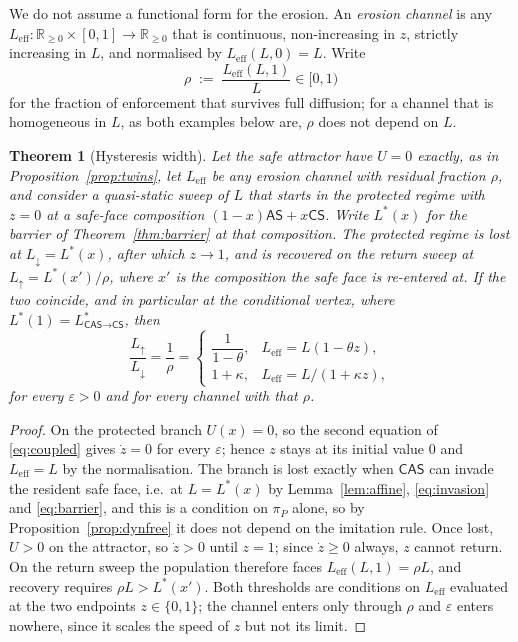 \documentclass[11pt,a4paper]{article}
\newtheorem{theorem}{Theorem}
\theoremstyle{definition}
\newcommand{\AS}{\textsf{AS}}
\newcommand{\CS}{\textsf{CS}}
\newcommand{\CAS}{\textsf{CAS}}
\newcommand{\piP}{\pi_{P}}
\newcommand{\R}{\mathbb{R}}
\begin{document}
We do not assume a functional form for the erosion. An \emph{erosion channel}
is any $L_{\mathrm{eff}}:\R_{\ge0}\times[0,1]\to\R_{\ge0}$ that is continuous,
non-increasing in $z$, strictly increasing in $L$, and normalised by
$L_{\mathrm{eff}}(L,0)=L$. Write
\begin{equation}
\rho \;:=\; \frac{L_{\mathrm{eff}}(L,1)}{L}\in[0,1)
\label{eq:rho}
\end{equation}
for the fraction of enforcement that survives full diffusion; for a channel
that is homogeneous in $L$, as both examples below are, $\rho$ does not depend
on $L$.

\begin{theorem}[Hysteresis width]\label{thm:hysteresis}
Let the safe attractor have $U=0$ exactly, as in
Proposition~\ref{prop:twins}, let $L_{\mathrm{eff}}$ be any erosion channel
with residual fraction $\rho$, and consider a quasi-static sweep of $L$ that
starts in the protected regime with $z=0$ at a safe-face composition
$(1-x)\AS+x\CS$. Write $L^{*}(x)$ for the barrier of
Theorem~\ref{thm:barrier} at that composition. The protected regime is lost at
$L_{\downarrow}=L^{*}(x)$, after which $z\to 1$, and is recovered on the
return sweep at $L_{\uparrow}=L^{*}(x')/\rho$, where $x'$ is the composition
the safe face is re-entered at. If the two coincide, and in particular at the
conditional vertex, where $L^{*}(1)=L^{*}_{\CAS\to\CS}$, then
\begin{equation}
\frac{L_{\uparrow}}{L_{\downarrow}}=\frac{1}{\rho}
=\begin{cases}
\dfrac{1}{1-\theta}, & L_{\mathrm{eff}}=L(1-\theta z),\\[8pt]
1+\kappa, & L_{\mathrm{eff}}=L/(1+\kappa z),
\end{cases}
\label{eq:width}
\end{equation}
for every $\varepsilon>0$ and for every channel with that $\rho$.
\end{theorem}

\begin{proof}
On the protected branch $U(x)=0$, so the second equation of \eqref{eq:coupled}
gives $\dot z=0$ for every $\varepsilon$; hence $z$ stays at its initial value
$0$ and $L_{\mathrm{eff}}=L$ by the normalisation. The branch is lost exactly
when $\CAS$ can invade the resident safe face, i.e.\ at $L=L^{*}(x)$ by
Lemma~\ref{lem:affine}, \eqref{eq:invasion} and \eqref{eq:barrier}, and this
is a condition on $\piP$ alone, so by Proposition~\ref{prop:dynfree} it does
not depend on the imitation rule. Once lost, $U>0$ on the attractor, so
$\dot z>0$ until $z=1$; since $\dot z\ge0$ always, $z$ cannot return. On the
return sweep the population therefore faces $L_{\mathrm{eff}}(L,1)=\rho L$,
and recovery requires $\rho L>L^{*}(x')$. Both thresholds are conditions on
$L_{\mathrm{eff}}$ evaluated at the two endpoints $z\in\{0,1\}$; the channel
enters only through $\rho$ and $\varepsilon$ enters nowhere, since it scales
the speed of $z$ but not its limit.
\end{proof}
\end{document}
